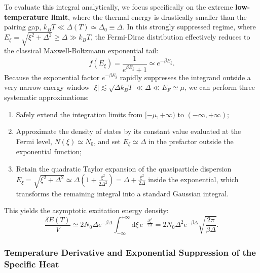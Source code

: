 To evaluate this integral analytically, we focus specifically on the extreme \textbf{low-temperature limit}, where the thermal energy is drastically smaller than the pairing gap, \( k_B T \ll \Delta(T) \simeq \Delta_0 \equiv \Delta \). In this strongly suppressed regime, where \( E_\xi = \sqrt{\xi^2 + \Delta^2} \ge \Delta \gg k_B T \), the Fermi-Dirac distribution effectively reduces to the classical Maxwell-Boltzmann exponential tail:
\[
    f(E_\xi) = \frac{1}{e^{\beta E_\xi} + 1} \simeq e^{-\beta E_\xi}.
\]
Because the exponential factor \( e^{-\beta E_\xi} \) rapidly suppresses the integrand outside a very narrow energy window \( |\xi| \lesssim \sqrt{\Delta k_B T} \ll \Delta \ll E_F \simeq \mu \), we can perform three systematic approximations:
\begin{enumerate}
    \item Safely extend the integration limits from \( [-\mu, +\infty) \) to \( (-\infty, +\infty) \);
    \item Approximate the density of states by its constant value evaluated at the Fermi level, \( N(\xi) \simeq N_0 \), and set \( E_\xi \simeq \Delta \) in the prefactor outside the exponential function;
    \item Retain the quadratic Taylor expansion of the quasiparticle dispersion \( E_\xi = \sqrt{\xi^2 + \Delta^2} \simeq \Delta\left( 1 + \frac{\xi^2}{2\Delta^2} \right) = \Delta + \frac{\xi^2}{2\Delta} \) inside the exponential, which transforms the remaining integral into a standard Gaussian integral.
\end{enumerate}
This yields the asymptotic excitation energy density:
\[
    \frac{\delta E(T)}{V} \simeq 2N_0 \Delta e^{-\beta\Delta} \int_{-\infty}^{+\infty} \mathrm{d}\xi \, e^{-\frac{\beta\xi^2}{2\Delta}} = 2N_0 \Delta^2 e^{-\beta\Delta} \sqrt{\frac{2\pi}{\beta\Delta}}.
\]

\subsubsection{Temperature Derivative and Exponential Suppression of the Specific Heat}

